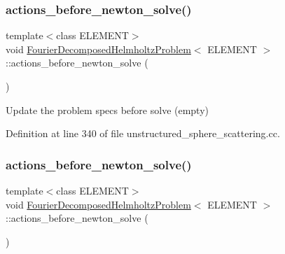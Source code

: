 \subsubsection{\texorpdfstring{actions\+\_\+before\+\_\+newton\+\_\+solve()}{actions\_before\_newton\_solve()}\hspace{0.1cm}{\footnotesize\ttfamily [1/2]}}
{\footnotesize\ttfamily template$<$class E\+L\+E\+M\+E\+NT$>$ \\
void \hyperlink{classFourierDecomposedHelmholtzProblem}{Fourier\+Decomposed\+Helmholtz\+Problem}$<$ E\+L\+E\+M\+E\+NT $>$\+::actions\+\_\+before\+\_\+newton\+\_\+solve (\begin{DoxyParamCaption}{ }\end{DoxyParamCaption})\hspace{0.3cm}{\ttfamily [inline]}}



Update the problem specs before solve (empty) 



Definition at line 340 of file unstructured\+\_\+sphere\+\_\+scattering.\+cc.

\mbox{\label{classFourierDecomposedHelmholtzProblem_a82ef5a969f4404fc1acb35c38c800ce6}} 
\subsubsection{\texorpdfstring{actions\+\_\+before\+\_\+newton\+\_\+solve()}{actions\_before\_newton\_solve()}\hspace{0.1cm}{\footnotesize\ttfamily [2/2]}}
{\footnotesize\ttfamily template$<$class E\+L\+E\+M\+E\+NT$>$ \\
void \hyperlink{classFourierDecomposedHelmholtzProblem}{Fourier\+Decomposed\+Helmholtz\+Problem}$<$ E\+L\+E\+M\+E\+NT $>$\+::actions\+\_\+before\+\_\+newton\+\_\+solve (\begin{DoxyParamCaption}{ }\end{DoxyParamCaption})\hspace{0.3cm}{\ttfamily [inline]}}




